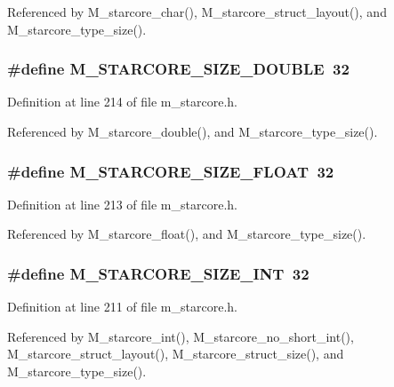 Referenced by M\_\-starcore\_\-char(), M\_\-starcore\_\-struct\_\-layout(), and M\_\-starcore\_\-type\_\-size().
\subsubsection{\setlength{\rightskip}{0pt plus 5cm}\#define M\_\-STARCORE\_\-SIZE\_\-DOUBLE~32}\label{m__starcore_8h_7277220110ad8b0da39db99bb79948a6}




Definition at line 214 of file m\_\-starcore.h.

Referenced by M\_\-starcore\_\-double(), and M\_\-starcore\_\-type\_\-size().
\subsubsection{\setlength{\rightskip}{0pt plus 5cm}\#define M\_\-STARCORE\_\-SIZE\_\-FLOAT~32}\label{m__starcore_8h_a9d12acbe5469f1c9f8357c5f268b199}




Definition at line 213 of file m\_\-starcore.h.

Referenced by M\_\-starcore\_\-float(), and M\_\-starcore\_\-type\_\-size().
\subsubsection{\setlength{\rightskip}{0pt plus 5cm}\#define M\_\-STARCORE\_\-SIZE\_\-INT~32}\label{m__starcore_8h_fd1a1de42fd0c5a51b0757dcc75c6f76}




Definition at line 211 of file m\_\-starcore.h.

Referenced by M\_\-starcore\_\-int(), M\_\-starcore\_\-no\_\-short\_\-int(), M\_\-starcore\_\-struct\_\-layout(), M\_\-starcore\_\-struct\_\-size(), and M\_\-starcore\_\-type\_\-size().
